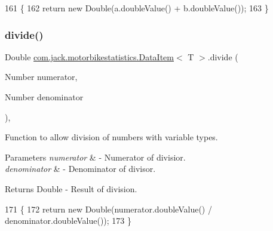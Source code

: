 \begin{DoxyCode}
161                                            \{
162         \textcolor{keywordflow}{return} \textcolor{keyword}{new} Double(a.doubleValue() + b.doubleValue());
163     \}
\end{DoxyCode}
\mbox{\label{classcom_1_1jack_1_1motorbikestatistics_1_1_data_item_aab2f3e4b1cfbceb79b6477020798c417}} 
\subsubsection{\texorpdfstring{divide()}{divide()}}
{\footnotesize\ttfamily Double \hyperlink{classcom_1_1jack_1_1motorbikestatistics_1_1_data_item}{com.\+jack.\+motorbikestatistics.\+Data\+Item}$<$ T $>$.divide (\begin{DoxyParamCaption}\item[{Number}]{numerator,  }\item[{Number}]{denominator }\end{DoxyParamCaption})\hspace{0.3cm}{\ttfamily [inline]}, {\ttfamily [private]}}



Function to allow division of numbers with variable types. 


\begin{DoxyParams}{Parameters}
{\em numerator} & -\/ Numerator of divisior. \\
\hline
{\em denominator} & -\/ Denominator of divisor. \\
\hline
\end{DoxyParams}
\begin{DoxyReturn}{Returns}
Double -\/ Result of division. 
\end{DoxyReturn}

\begin{DoxyCode}
171                                                                 \{
172         \textcolor{keywordflow}{return} \textcolor{keyword}{new} Double(numerator.doubleValue() / denominator.doubleValue());
173     \}
\end{DoxyCode}
\mbox{\label{classcom_1_1jack_1_1motorbikestatistics_1_1_data_item_a05da757bcb7a824c289a401c8e645264}} 
